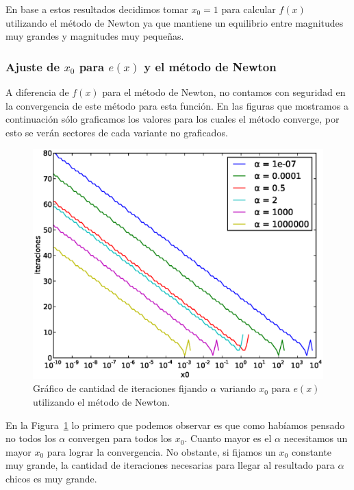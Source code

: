 En base a estos resultados decidimos tomar $x_0 = 1$ para calcular $f(x)$
utilizando el método de Newton ya que mantiene un equilibrio entre magnitudes
muy grandes y magnitudes muy pequeñas.

\subsubsection{Ajuste de $x_0$ para $e(x)$ y el método de Newton}

A diferencia de $f(x)$ para el método de Newton, no contamos con seguridad en
la convergencia de este método para esta función. En las figuras que mostramos
a continuación sólo graficamos los valores para los cuales el método converge,
por esto se verán sectores de cada variante no graficados.\\

\begin{figure}[!htbp]
  \begin{center}
    \includegraphics[scale=0.5]{graficos/new/e_newton_x0_variable.eps}
    \caption{\label{fig:e_newton_x0_variable} Gráfico de cantidad de iteraciones fijando $\alpha$ variando $x_0$ para $e(x)$ utilizando el método de Newton.}
  \end{center}
\end{figure}

En la Figura~\ref{fig:e_newton_x0_variable} lo primero que podemos observar es que
como habíamos pensado no todos los $\alpha$ convergen para todos los $x_0$. Cuanto
mayor es el $\alpha$ necesitamos un mayor $x_0$ para lograr la convergencia. No
obstante, si fijamos un $x_0$ constante muy grande, la cantidad de iteraciones
necesarias para llegar al resultado para $\alpha$ chicos es muy grande.\\

